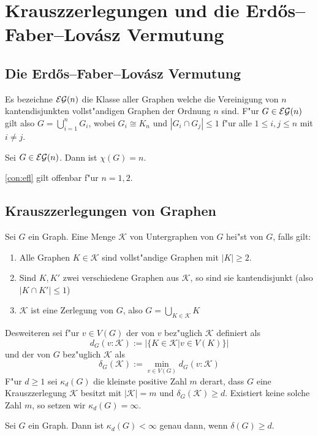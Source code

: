 \section{Krauszzerlegungen und die Erd\H{o}s--Faber--Lov\'asz Vermutung}
\subsection{Die Erd\H{o}s--Faber--Lov\'asz Vermutung}
\label{sec:EFL-Vermutung}
Es bezeichne ${\cal EG}(n)$ die Klasse aller Graphen welche die Vereinigung von $n$ kantendisjunkten vollst"andigen Graphen der Ordnung $n$ sind. F"ur $G\in{\cal EG}(n)$ gilt also $G= \bigcup\limits_{i=1}^{n} G_i$, wobei $G_i \cong K_n$ und $|G_i \cap G_j| \leq 1$ f"ur alle $1\leq i,j \leq n$ mit $i\neq j$. 
\begin{conjecture}
  Sei $G\in{\cal EG}(n)$. Dann ist $\chi(G) = n$.
  \label{con:efl}
\end{conjecture}

\begin{remark}
  \ref{con:efl} gilt offenbar f"ur $n = 1,2$. 
\end{remark}

\subsection{Krauszzerlegungen von Graphen}
\label{ssec:Krauszzerlegung}
\begin{definition}
  \label{def:Krauszzerlegung}
  Sei $G$ ein Graph. Eine Menge $\mathcal K$ von Untergraphen von $G$ hei"st  von $G$, falls gilt:
  \begin{enumerate}[label=(\roman*)]
    \item Alle Graphen $K\in \mathcal{K}$ sind vollst"andige Graphen mit $|K| \geq 2$.
    \item Sind $K,K'$ zwei verschiedene Graphen aus $\mathcal{K}$, so sind sie kantendisjunkt (also $|K\cap K'| \leq 1$)
    \item $\mathcal K$ ist eine Zerlegung von $G$, also  $G=\bigcup\limits_{K\in \mathcal K}K$
  \end{enumerate}
  Desweiteren sei f"ur $v\in V(G)$ der  von $v$ bez"uglich $\mathcal K$ definiert als $$d_G(v:\mathcal K) := |\{ K\in\mathcal K| v \in V(K)\}|$$ und der  von $G$ bez"uglich $\mathcal K$ als $$\delta_G(\mathcal K) := \min\limits_{v\in V(G)}d_G(v:\mathcal K)$$ 
  F"ur $d \geq 1$ sei $\kappa_d(G)$ die kleinste positive Zahl $m$ derart, dass $G$ eine Krauszzerlegung $\mathcal K$ besitzt mit $|\mathcal K| = m$ und $\delta_G(\mathcal K) \geq d$. Existiert keine solche Zahl $m$, so setzen wir $\kappa_{d}(G) = \infty$.
\end{definition}
\begin{lemma}
  Sei $G$ ein Graph. Dann ist $\kappa_d(G) < \infty$ genau dann, wenn $\delta(G) \geq d$.
  \label{lm:krauszexistenz}
\end{lemma}

